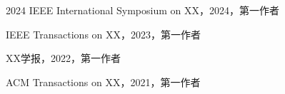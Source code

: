 %
%

\reseachresult

\begin{enumerate}[{[}1{]}]
\item 2024 IEEE International Symposium on XX，2024，第一作者
\item IEEE Transactions on XX，2023，第一作者
\item XX学报，2022，第一作者
\item ACM Transactions on XX，2021，第一作者
\end{enumerate}